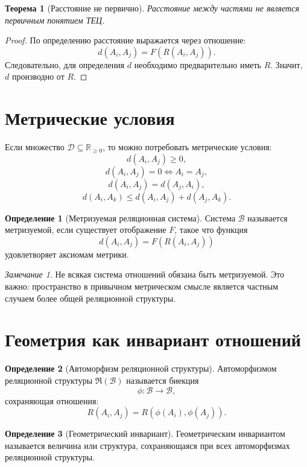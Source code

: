 \documentclass[12pt,a4paper,oneside]{book}
\theoremstyle{definition}
\newtheorem{definition}{Определение}[chapter]
\theoremstyle{plain}
\newtheorem{theorem}{Теорема}[chapter]
\theoremstyle{remark}
\newtheorem{remark}{Замечание}[chapter]
\newcommand{\SubParts}{\mathcal B}
\newcommand{\Rel}{R}
\newcommand{\DistVals}{\mathcal D}
\begin{document}
\begin{theorem}[Расстояние не первично]
Расстояние между частями не является первичным понятием ТЕЦ.
\end{theorem}

\begin{proof}
По определению расстояние выражается через отношение:
\[
d(A_i,A_j)=F(\Rel(A_i,A_j)).
\]
Следовательно, для определения \(d\) необходимо предварительно иметь \(\Rel\). Значит, \(d\) производно от \(\Rel\).
\end{proof}

\section{Метрические условия}

Если множество \(\DistVals\subseteq\mathbb R_{\ge0}\), то можно потребовать метрические условия:
\[
d(A_i,A_j)\ge0,
\]
\[
d(A_i,A_j)=0\iff A_i=A_j,
\]
\[
d(A_i,A_j)=d(A_j,A_i),
\]
\[
d(A_i,A_k)\le d(A_i,A_j)+d(A_j,A_k).
\]

\begin{definition}[Метризуемая реляционная система]
Система \(\SubParts\) называется метризуемой, если существует отображение \(F\), такое что функция
\[
d(A_i,A_j)=F(\Rel(A_i,A_j))
\]
удовлетворяет аксиомам метрики.
\end{definition}

\begin{remark}
Не всякая система отношений обязана быть метризуемой. Это важно: пространство в привычном метрическом смысле является частным случаем более общей реляционной структуры.
\end{remark}

\section{Геометрия как инвариант отношений}

\begin{definition}[Автоморфизм реляционной структуры]
Автоморфизмом реляционной структуры \(\mathfrak R(\SubParts)\) называется биекция
\[
\phi:\SubParts\to\SubParts,
\]
сохраняющая отношения:
\[
\Rel(A_i,A_j)=\Rel(\phi(A_i),\phi(A_j)).
\]
\end{definition}

\begin{definition}[Геометрический инвариант]
Геометрическим инвариантом называется величина или структура, сохраняющаяся при всех автоморфизмах реляционной структуры.
\end{definition}
\end{document}
